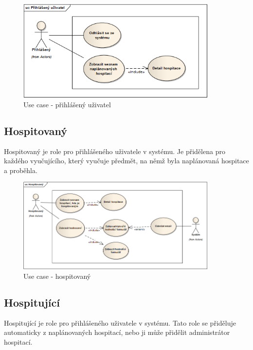 \begin{figure}[H]
\begin{center}
\includegraphics[width=10cm]{figures/actor_logged}
\caption{Use case - přihlášený uživatel}
\label{fig:actor_logged}
\end{center}
\end{figure}


\subsection{Hospitovaný}
Hospitovaný je role pro přihlášeného uživatele v systému. Je přidělena pro každého vyučujícího, který vyučuje předmět, na němž byla naplánovaná hospitace a proběhla.

\begin{figure}[H]
\begin{center}
\includegraphics[width=10cm]{figures/actor_observed}
\caption{Use case - hospitovaný}
\label{fig:actor_observed}
\end{center}
\end{figure}

\subsection{Hospitující}
Hospitující je role pro přihlášeného uživatele v systému. Tato role se přiděluje automaticky z naplánovaných hospitací, nebo ji může přidělit administrátor hospitací.

